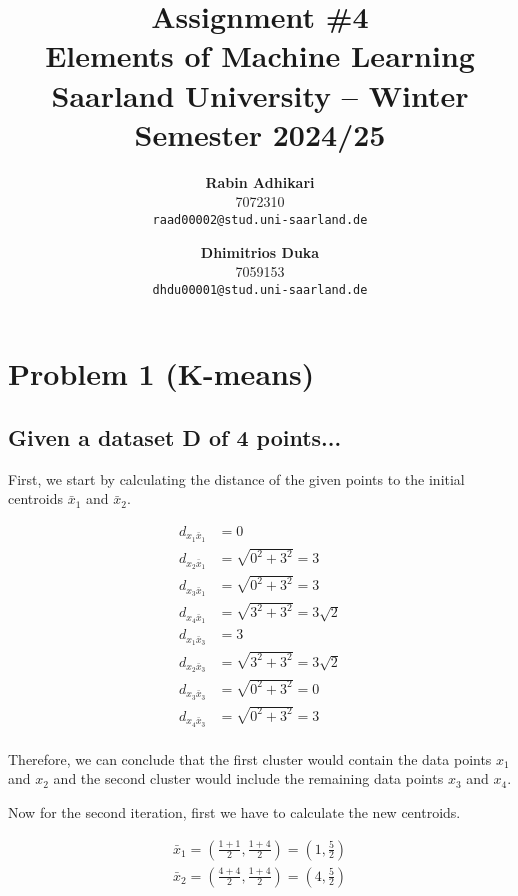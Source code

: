 \documentclass{article}
\title{Assignment \#4\\
  \vspace{2mm}
  \small{Elements of Machine Learning}
  \\
  \vspace{2mm}
  \small{Saarland University -- Winter Semester 2024/25}
}
\author{%
\textbf{Rabin Adhikari} \\
  7072310 \\
  \texttt{raad00002@stud.uni-saarland.de} \\
  \and
  \textbf{Dhimitrios Duka} \\
 7059153 \\
  \texttt{dhdu00001@stud.uni-saarland.de} \\
}
\begin{document}
\maketitle

\section{Problem 1 (K-means)}
\subsection{Given a dataset D of 4 points...}

First, we start by calculating the distance of the given points to the initial centroids $\bar{x}_1$ and $\bar{x}_2$. 

\begin{equation}
 \begin{aligned}
 d_{x_1\bar{x}_1} &= 0 \\
 d_{x_2\bar{x}_1} &= \sqrt{0^2 + 3^2} = 3 \\
 d_{x_3\bar{x}_1} &= \sqrt{0^2 + 3^2} = 3 \\
 d_{x_4\bar{x}_1} &= \sqrt{3^2 + 3^2} = 3\sqrt{2} \\
 d_{x_1\bar{x}_3} &= 3 \\
 d_{x_2\bar{x}_3} &= \sqrt{3^2 + 3^2} = 3\sqrt{2} \\
 d_{x_3\bar{x}_3} &= \sqrt{0^2 + 3^2} = 0 \\
 d_{x_4\bar{x}_3} &= \sqrt{0^2 + 3^2} = 3 \\
 \end{aligned}
\end{equation}

Therefore, we can conclude that the first cluster would contain the data points $x_1$ and $x_2$ and the second cluster would include the remaining data points $x_3$ and $x_4$.

Now for the second iteration, first we have to calculate the new centroids. 

\begin{equation}
 \begin{aligned}
 \bar{x}_1 = (\frac{1 + 1}{2}, \frac{1 + 4}{2}) = (1, \frac{5}{2}) \\
 \bar{x}_2 = (\frac{4 + 4}{2}, \frac{1 + 4}{2}) = (4, \frac{5}{2})
 \end{aligned}
 \label{eq:centroids}
\end{equation}
\end{document}
